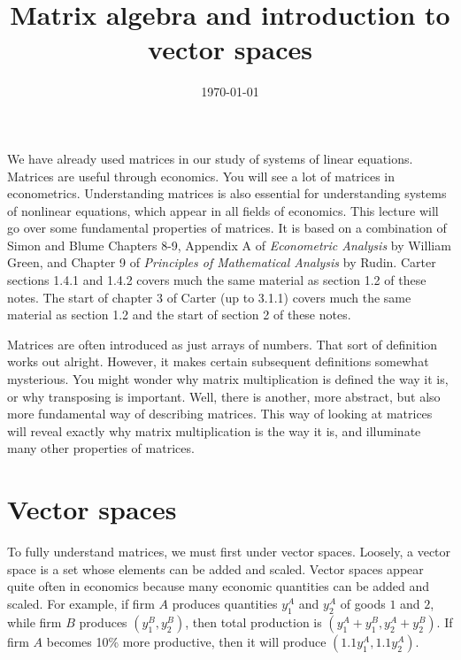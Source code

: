 \documentclass[12pt,reqno]{amsart}
\title{Matrix algebra and introduction to vector spaces}
\date{\today}
\theoremstyle{definition}
\begin{document}
\maketitle

We have already used matrices in our study of systems of linear
equations. Matrices are useful through economics. You will see a lot
of matrices in econometrics. Understanding matrices is also essential
for understanding systems of nonlinear equations, which appear in all
fields of economics. This lecture will go over some fundamental
properties of matrices. It is based on a combination of Simon and
Blume Chapters 8-9, Appendix A of \textit{Econometric Analysis} by
William Green, and Chapter 9 of \textit{Principles of Mathematical
  Analysis} by Rudin. Carter sections 1.4.1 and 1.4.2 covers much the
same material as section 1.2 of these notes. The start of chapter 3 of
Carter (up to 3.1.1) covers much the same material as section 1.2 and
the start of section 2 of these notes. 



Matrices are often introduced as just arrays of numbers.  That sort of
definition works out alright. However, it makes certain subsequent
definitions somewhat mysterious. You might wonder why matrix
multiplication is defined the way it is, or why transposing is
important.  Well, there is another, more abstract, but also more
fundamental way of describing matrices. This way of looking at
matrices will reveal exactly why matrix multiplication is the way it
is, and illuminate many other properties of matrices. 

\section{Vector spaces}

To fully understand matrices, we must first under vector
spaces. Loosely, a vector space is a set whose elements can be added
and scaled. Vector spaces appear quite often in economics because many
economic quantities can be added and scaled. For example, if firm $A$
produces quantities $y_1^A$ and $y_2^A$ of goods  $1$ and $2$, while
firm $B$ produces $(y_1^B,y_2^B)$, then total production is
$(y_1^A+y_1^B, y_2^A+y_2^B)$. If firm $A$ becomes 10\% more
productive, then it will produce $(1.1 y_1^A, 1.1 y_2^A)$. 
\end{document}
